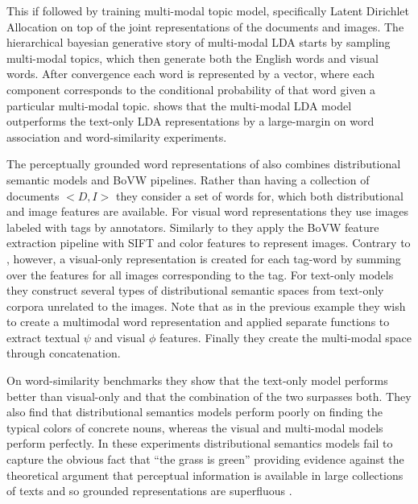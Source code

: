  This if followed by training multi-modal
 topic model, specifically Latent Dirichlet Allocation \citep{blei2003latent}
on top of the joint representations of the documents and images.
The hierarchical bayesian generative story of multi-modal LDA  starts by sampling multi-modal topics,
which then generate both the English words and visual words.
After convergence each word is represented by a vector,
where each component corresponds to the conditional probability of that word given 
a particular multi-modal topic. \cite{feng2010visual}
shows that the multi-modal LDA model outperforms the text-only LDA representations by a
large-margin on word association and word-similarity experiments.

The perceptually grounded word representations of \cite{bruni2012distributional}
also combines distributional semantic models and BoVW pipelines.
Rather than having a collection of documents $<D, I>$ they consider a set of words for, which
both distributional and image features are available. For visual word representations
they use images labeled with tags by annotators. Similarly to \cite{feng2010visual} they
apply the BoVW feature extraction pipeline with SIFT and color features to
represent images. Contrary to \cite{feng2010visual}, however,
a visual-only representation is created for each tag-word by summing over the features
for all images corresponding to the tag.
For text-only models they construct several types of distributional semantic spaces
from text-only corpora unrelated to the images.
Note that as in the previous example they wish to create a multimodal
word representation and applied separate functions to extract textual $\psi$ and visual
$\phi$ features. Finally they create the multi-modal space through concatenation.

On word-similarity benchmarks they show that the text-only model performs better than visual-only
and that the combination of the two surpasses both.
They also find that distributional semantics
models perform poorly on finding the typical colors of concrete nouns,
whereas the visual and multi-modal models perform perfectly. In these experiments
distributional semantics models fail to capture the obvious fact that ``the grass is green''
providing evidence against the theoretical argument that perceptual information is available in
large collections of texts and so grounded representations are superfluous \citep{louwerse2011symbol}.


